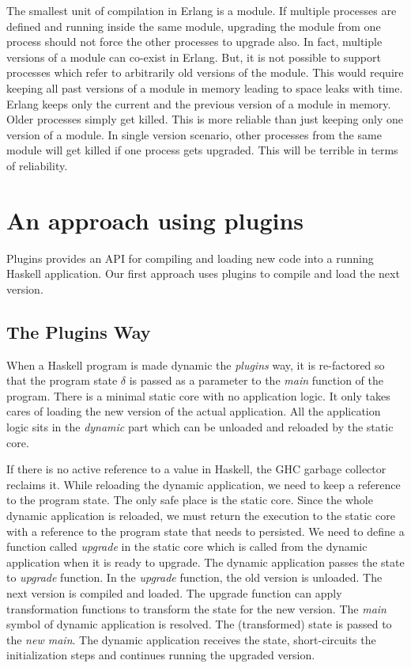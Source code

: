 The smallest unit of compilation in Erlang is a module. If multiple
processes are defined and running inside the same module, upgrading
the module from one process should not force the other processes to
upgrade also. In fact, multiple versions of a module can co-exist in
Erlang. But, it is not possible to support processes which refer to
arbitrarily old versions of the module. This would require keeping all
past versions of a module in memory leading to space leaks with
time. Erlang keeps only the current and the previous version of a
module in memory. Older processes simply get killed. This is more
reliable than just keeping only one version of a module. In single
version scenario, other processes from the same module will get killed
if one process gets upgraded. This will be terrible in terms of
reliability.

\section{An approach using plugins}
\label{sec:approach1}

Plugins \cite{_hackage:_????} provides an API for compiling and
loading new code into a running Haskell application. Our first
approach uses plugins to compile and load the next version.

\subsection{The Plugins Way}

When a Haskell program is made dynamic the \emph{plugins} way, it is
re-factored so that the program state $\delta$ is passed as a
parameter to the \emph{main} function of the program.  There is a
minimal static core with no application logic. It only takes cares of
loading the new version of the actual application. All the application
logic sits in the \emph{dynamic} part which can be unloaded and
reloaded by the static core.

If there is no active reference to a value in Haskell, the GHC garbage
collector reclaims it. While reloading the dynamic application, we
need to keep a reference to the program state. The only safe place is
the static core. Since the whole dynamic application is reloaded, we
must return the execution to the static core with a reference to
the program state that needs to persisted.  We need to define a
function called \emph{upgrade} in the static core which is called from
the dynamic application when it is ready to upgrade. The dynamic
application passes the state to \emph{upgrade} function. In the
\emph{upgrade} function, the old version is unloaded. The next version
is compiled and loaded. The upgrade function can apply transformation
functions to transform the state for the new version. The \emph{main}
symbol of dynamic application is resolved. The (transformed) state is
passed to the \emph{new main}. The dynamic application receives the
state, short-circuits the initialization steps and continues running
the upgraded version.

